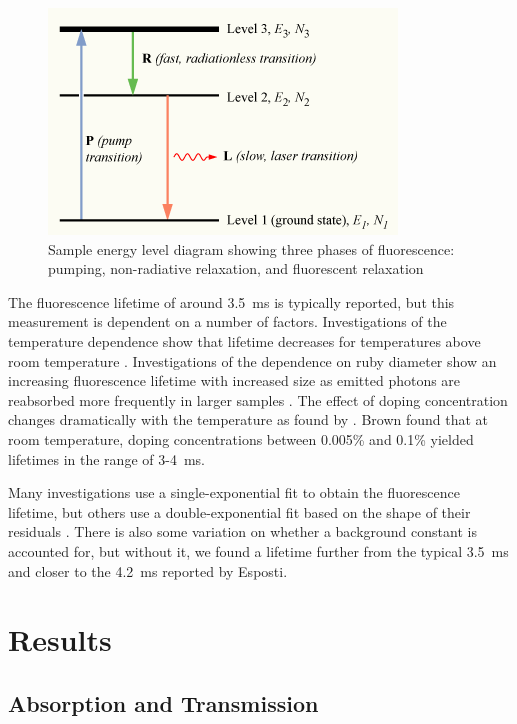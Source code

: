 \documentclass[11pt, a4paper, twocolumn]{article}
\begin{document}
\begin{figure}[t]
\includegraphics[width=\linewidth]{Population-inversion-3level.png}
\caption{Sample energy level diagram showing three phases of fluorescence: pumping, non-radiative relaxation, and fluorescent relaxation}
\label{fig:populationInversion}
\end{figure}

The fluorescence lifetime of around \SI{3.5}{\ms} is typically reported, but this measurement is dependent on a number of factors. Investigations of the temperature dependence show that lifetime decreases for temperatures above room temperature \cite{Seat, Nelson}. Investigations of the dependence on ruby diameter show an increasing fluorescence lifetime with increased size as emitted photons are reabsorbed more frequently in larger samples \cite{Jones}. The effect of doping concentration changes dramatically with the temperature as found by \cite{Brown}. Brown found that at room temperature, doping concentrations between 0.005\% and 0.1\% yielded lifetimes in the range of 3-\SI{4}{\ms}.

Many investigations use a single-exponential fit to obtain the fluorescence lifetime, but others use a double-exponential fit based on the shape of their residuals \cite{McBane, Jones}. There is also some variation on whether a background constant is accounted for, but without it, we found a lifetime further from the typical \SI{3.5}{\ms} and closer to the \SI{4.2}{\ms} reported by Esposti.
\section*{Results}
\subsection*{Absorption and Transmission}
\end{document}

